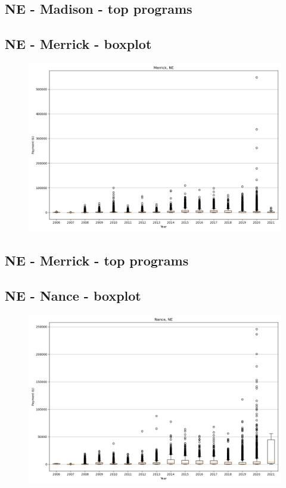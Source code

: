 \subsection*{NE - Madison - top programs}

\newpage
\subsection*{NE - Merrick - boxplot}
\begin{figure}[h]
\centering
\includegraphics[width=7in]{../output/boxplots/counties/Merrick-NE_boxplot.png}
\end{figure}


\subsection*{NE - Merrick - top programs}

\newpage
\subsection*{NE - Nance - boxplot}
\begin{figure}[h]
\centering
\includegraphics[width=7in]{../output/boxplots/counties/Nance-NE_boxplot.png}
\end{figure}


